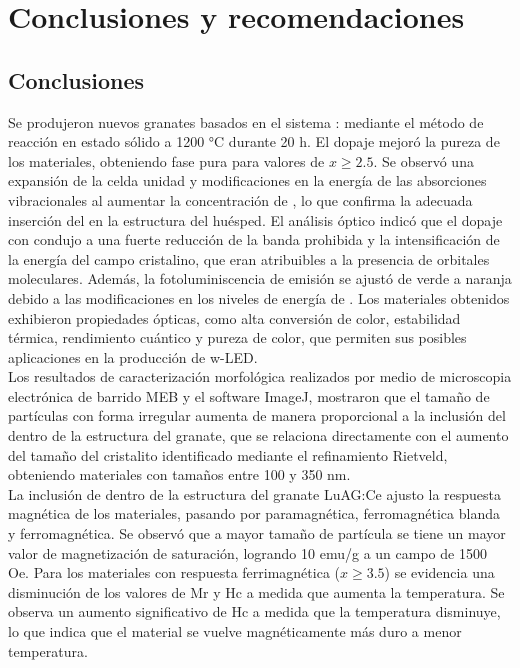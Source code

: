\chapter{Conclusiones y recomendaciones}
\section{Conclusiones}

Se produjeron nuevos granates basados en el sistema
: mediante el método de reacción en estado
sólido a 1200 °C durante 20 h. El dopaje  mejoró la pureza de los
materiales, obteniendo fase pura para valores de $x \geq  2.5$. Se observó una
expansión de la celda unidad y modificaciones en la energía de las absorciones
vibracionales al aumentar la concentración de , lo que confirma la
adecuada
inserción del  en la estructura del huésped. El análisis óptico
indicó que
el dopaje con  condujo a una fuerte reducción de la banda prohibida
y la
intensificación de la energía del campo cristalino, que eran atribuibles a la
presencia de orbitales moleculares. Además, la fotoluminiscencia de emisión se
ajustó de verde a naranja debido a las modificaciones en los niveles de energía
de . Los materiales obtenidos exhibieron propiedades ópticas, como
alta
conversión de color, estabilidad térmica, rendimiento cuántico y pureza de
color, que permiten sus posibles aplicaciones en la producción de w-LED.\\

Los resultados de caracterización morfológica realizados por medio de
microscopia electrónica de barrido MEB y el software ImageJ, mostraron que el
tamaño de partículas con forma irregular aumenta de manera proporcional a la
inclusión del  dentro de la estructura del granate, que se
relaciona
directamente con el aumento del tamaño del cristalito identificado mediante
el refinamiento Rietveld, obteniendo materiales con tamaños entre 100 y 350
nm.\\

La inclusión de  dentro de la estructura del granate LuAG:Ce ajusto la
respuesta
magnética de los materiales, pasando por paramagnética, ferromagnética blanda y
ferromagnética.
Se observó que a mayor tamaño de partícula se tiene un mayor valor de
magnetización de saturación,
logrando 10 emu/g a un campo de 1500 Oe. Para los materiales con respuesta
ferrimagnética
($x \geq 3.5$) se evidencia una disminución de los valores de Mr y Hc a medida
que
aumenta la temperatura. Se observa un aumento significativo de Hc a medida que
la
temperatura disminuye, lo que indica que el material se vuelve magnéticamente
más
duro a menor temperatura.

